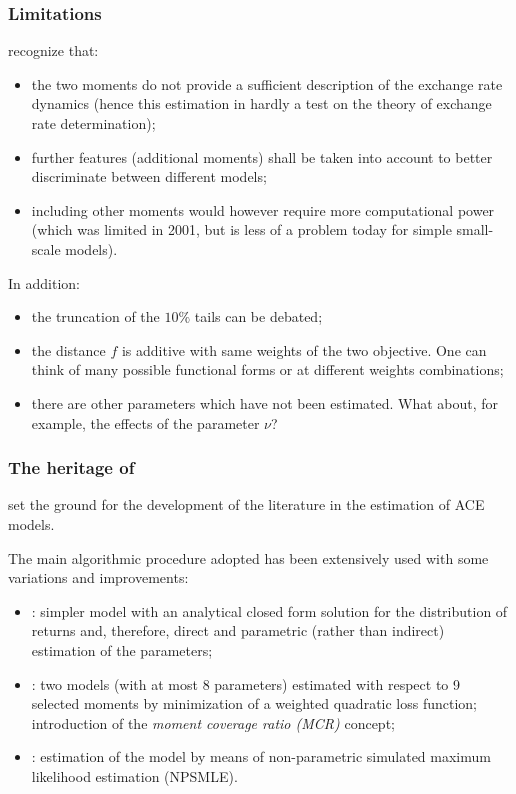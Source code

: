\documentclass[10pt]{beamer}
\begin{document}
\begin{frame}[c]\frametitle{Limitations}
    \citet{gilli2001estimation} recognize that:
    \begin{itemize}
    	\item the two moments do not provide a sufficient description of the exchange rate dynamics (hence this estimation in hardly a test on the theory of exchange rate determination);
    	\item further features (additional moments) shall be taken into account to better discriminate between different models;
    	\item including other moments would however require more computational power (which was limited in 2001, but is less of a problem today for simple small-scale models).
    \end{itemize}

    In addition: 
    \begin{itemize}
    	\item the truncation of the $10\%$ tails can be debated;
    	\item the distance $f$ is additive with same weights of the two objective. One can think of many possible functional forms or at different weights combinations;
    	\item there are other parameters which have not been estimated. What about, for example, the effects of the parameter $\nu$?
    \end{itemize}
\end{frame}


\begin{frame}[c]\frametitle{The heritage of \citet{gilli2001estimation}}
    \citet{gilli2001estimation} set the ground for the development of the literature in the estimation of ACE models. \bigskip

    The main algorithmic procedure adopted has been extensively used with some variations and improvements:
    \begin{itemize}
    	\item \citet{alfarano2005estimation}: simpler model with an analytical closed form solution for the distribution of returns and, therefore, direct and parametric (rather than indirect) estimation of the parameters; \smallskip
    	\item \citet{franke2012contest}: two models (with at most 8 parameters) estimated with respect to 9 selected moments by minimization of a weighted quadratic loss function; introduction of the \emph{moment coverage ratio (MCR)} concept; \smallskip
    	\item \citet{kukacka2017estimation}: estimation of the \citet{brock1998heterogeneous} model by means of non-parametric simulated maximum likelihood estimation (NPSMLE).
    \end{itemize}
\end{frame}
\end{document}
